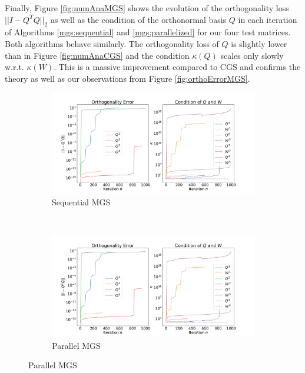 \documentclass{article}
\begin{document}
Finally, Figure \ref{fig:numAnaMGS} shows the evolution of the orthogonality
loss $||I - Q^T Q||_2$ as well as the condition of the orthonormal basis $Q$ in
each iteration of Algorithms \ref{mgs:sequential} and \ref{mgs:parallelized} for
our four test matrices. Both algorithms behave similarly. The orthogonality loss
of $Q$ is slightly lower than in Figure \ref{fig:numAnaCGS} and the condition
$\kappa(Q)$ scales only slowly w.r.t. $\kappa(W)$. This is a massive improvement
compared to CGS and confirms the theory as well as our observations from Figure
\ref{fig:orthoErrorMGS}.
\begin{figure}[t]
    \centering
    \caption{Numerical Analysis of MGS} \label{fig:numAnaMGS}
    \vspace*{-3mm}
    \begin{subfigure}{15cm}
        \includegraphics[width=\textwidth]{./plots/MGS_Numerical_Stability_Sequential_complete.pdf}
        \caption{Sequential MGS}
    \end{subfigure}\\
    \vspace*{-3mm}
    \begin{subfigure}{15cm}
        \includegraphics[width=\textwidth]{./plots/MGS_Numerical_Stability_Parallel_complete.pdf}
        \caption{Parallel MGS}
    \end{subfigure}
\end{figure}
\end{document}
